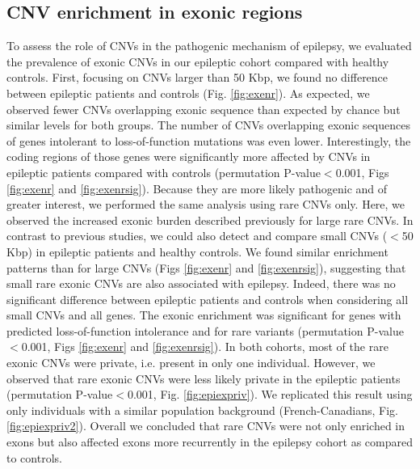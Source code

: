 \subsection*{CNV enrichment in exonic regions}
To assess the role of CNVs in the pathogenic mechanism of epilepsy, we evaluated the prevalence of exonic CNVs in our epileptic cohort compared with healthy controls.
First, focusing on CNVs larger than 50 Kbp, we found no difference between epileptic patients and controls (Fig. \ref{fig:exenr}).
As expected, we observed fewer CNVs overlapping exonic sequence than expected by chance but similar levels for both groups.
The number of CNVs overlapping exonic sequences of genes intolerant to loss-of-function mutations\cite{Lek2016} was even lower.
Interestingly, the coding regions of those genes were significantly more affected by CNVs in epileptic patients compared with controls (permutation P-value$<$0.001, Figs \ref{fig:exenr} and \ref{fig:exenrsig}).
Because they are more likely pathogenic and of greater interest, we performed the same analysis using rare CNVs only.
Here, we observed the increased exonic burden described previously for large rare CNVs\cite{Mefford2011,Heinzen2010,Striano2012}.
In contrast to previous studies, we could also detect and compare small CNVs ($<$50 Kbp) in epileptic patients and healthy controls.
We found similar enrichment patterns than for large CNVs (Figs \ref{fig:exenr} and \ref{fig:exenrsig}), suggesting that small rare exonic CNVs are also associated with epilepsy.
Indeed, there was no significant difference between epileptic patients and controls when considering all small CNVs and all genes.
The exonic enrichment was significant for genes with predicted loss-of-function intolerance and for rare variants (permutation P-value$<$0.001, Figs \ref{fig:exenr} and \ref{fig:exenrsig}).
In both cohorts, most of the rare exonic CNVs were private, i.e. present in only one individual.
However, we observed that rare exonic CNVs were less likely private in the epileptic patients (permutation P-value$<$0.001, Fig. \ref{fig:epiexpriv}).
We replicated this result using only individuals with a similar population background (French-Canadians, Fig. \ref{fig:epiexpriv2}).
Overall we concluded that rare CNVs were not only enriched in exons but also affected exons more recurrently in the epilepsy cohort as compared to controls.

